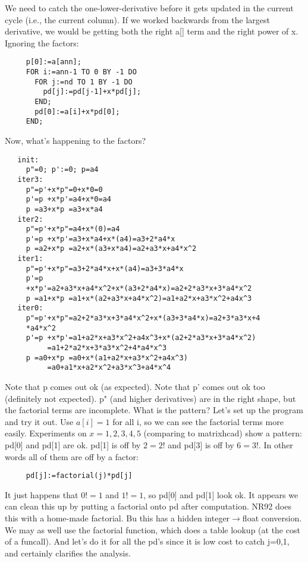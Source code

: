 We need to catch the one-lower-derivative before it gets
updated in the current cycle (i.e., the current column).  If
we worked backwards from the largest derivative, we would be
getting both the right a[] term and the right power of x.
Ignoring the factors:
\begin{verbatim}
     p[0]:=a[ann];
     FOR i:=ann-1 TO 0 BY -1 DO
       FOR j:=nd TO 1 BY -1 DO
         pd[j]:=pd[j-1]+x*pd[j];
       END;
       pd[0]:=a[i]+x*pd[0];
     END;
\end{verbatim}

Now, what's happening to the factors?
\begin{verbatim}
   init:
     p"=0; p':=0; p=a4
   iter3:
     p"=p'+x*p"=0+x*0=0
     p'=p +x*p'=a4+x*0=a4
     p =a3+x*p =a3+x*a4
   iter2:
     p"=p'+x*p"=a4+x*(0)=a4
     p'=p +x*p'=a3+x*a4+x*(a4)=a3+2*a4*x
     p =a2+x*p =a2+x*(a3+x*a4)=a2+a3*x+a4*x^2
   iter1:
     p"=p'+x*p"=a3+2*a4*x+x*(a4)=a3+3*a4*x
     p'=p
     +x*p'=a2+a3*x+a4*x^2+x*(a3+2*a4*x)=a2+2*a3*x+3*a4*x^2
     p =a1+x*p =a1+x*(a2+a3*x+a4*x^2)=a1+a2*x+a3*x^2+a4x^3
   iter0:
     p"=p'+x*p"=a2+2*a3*x+3*a4*x^2+x*(a3+3*a4*x)=a2+3*a3*x+4
     *a4*x^2
     p'=p +x*p'=a1+a2*x+a3*x^2+a4x^3+x*(a2+2*a3*x+3*a4*x^2)
          =a1+2*a2*x+3*a3*x^2+4*a4*x^3
     p =a0+x*p =a0+x*(a1+a2*x+a3*x^2+a4x^3)
          =a0+a1*x+a2*x^2+a3*x^3+a4*x^4
\end{verbatim}

Note that p comes out ok (as expected).  Note that p' comes
out ok too (definitely not expected).  p" (and higher
derivatives) are in the right shape, but the factorial terms
are incomplete.  What is the pattern?  Let's set up the
program and try it out.  Use $a[i]=1$ for all i, so we can see
the factorial terms more easily.  Experiments on
$x=1,2,3,4,5$ (comparing to matrixhcad) show a pattern:  pd[0]
and pd[1] are ok.  pd[1] is off by $2=2!$ and pd[3] is off by
$6=3!$.  In other words all of them are off by a factor:
\begin{verbatim}
     pd[j]:=factorial(j)*pd[j]
\end{verbatim}

It just happens that $0!=1$ and $1!=1$, so pd[0] and pd[1] look
ok.  It appears we can clean this up by putting a factorial
onto pd after computation.  NR92 does this with a home-made
factorial.  Bu this has a hidden integer$\rightarrow$float conversion.
We may as well use the factorial function, which does a
table lookup (at the cost of a funcall).  And let's do it
for all the pd's since it is low cost to catch j=0,1, and
certainly clarifies the analysis.


